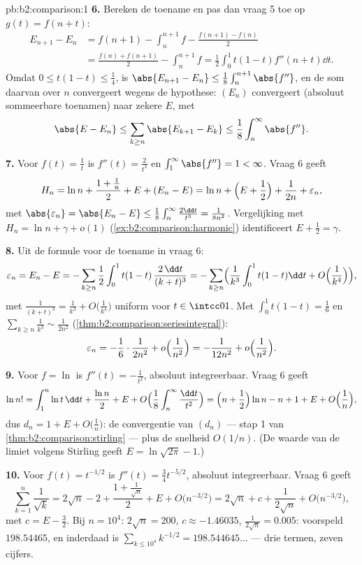 \begin{solution}{pb:b2:comparison:1}
\textbf{6.} Bereken de toename en pas dan vraag 5 toe op $g(t) =
f(n + t)$:
\begin{align*}
E_{n+1} - E_n
&= f(n{+}1) - \int_n^{n+1}\!f - \frac{f(n{+}1) - f(n)}2 \\
&= \frac{f(n) + f(n{+}1)}2 - \int_n^{n+1}\!f
= \frac12\int_0^1 t(1-t)f''(n+t)\dd t .
\end{align*}
Omdat $0 \leq t(1-t) \leq \frac14$, is $\abs{E_{n+1} - E_n} \leq
\frac18\int_n^{n+1}\abs{f''}$, en de som daarvan over $n$
convergeert wegens de hypothese: $(E_n)$ convergeert (absoluut
sommeerbare toenamen) naar zekere $E$, met
\[
\abs{E - E_n} \leq \sum_{k\geq n}\abs{E_{k+1} - E_k} \leq
\frac18\int_n^\infty\abs{f''} .
\]

\textbf{7.} Voor $f(t) = \frac1t$ is $f''(t) = \frac2{t^3}$ en
$\int_1^\infty\abs{f''} = 1 < \infty$. Vraag 6 geeft
\[
H_n = \ln n + \frac{1 + \frac1n}{2} + E + (E_n - E)
= \ln n + \Bigl(E + \frac12\Bigr) + \frac1{2n} +
\varepsilon_n,
\]
met $\abs{\varepsilon_n} = \abs{E_n - E} \leq
\frac18\int_n^\infty\frac{2\dd t}{t^3} = \frac1{8n^2}$.
Vergelijking met $H_n = \ln n + \gamma + o(1)$
(\cref{ex:b2:comparison:harmonic}) identificeert $E + \frac12 =
\gamma$.

\textbf{8.} Uit de formule voor de toename in vraag 6:
\[
\varepsilon_n = E_n - E = -\sum_{k\geq n}\frac12\int_0^1
t(1-t)\,\frac{2\,\dd t}{(k+t)^3}
= -\sum_{k \geq n}\Bigl(\frac1{k^3}\int_0^1t(1-t)\dd t +
O\Bigl(\frac1{k^4}\Bigr)\Bigr),
\]
met $\frac{1}{(k+t)^3} = \frac1{k^3} + O\bigl(\frac1{k^4}\bigr)$
uniform voor $t \in \intcc01$. Met $\int_0^1 t(1-t) = \frac16$ en
$\sum_{k\geq n}\frac1{k^3} \sim \frac{1}{2n^2}$
(\cref{thm:b2:comparison:seriesintegral}):
\[
\varepsilon_n = -\frac16\cdot\frac{1}{2n^2} +
o\Bigl(\frac1{n^2}\Bigr) = -\frac{1}{12n^2} +
o\Bigl(\frac{1}{n^2}\Bigr).
\]

\textbf{9.} Voor $f = \ln$ is $f''(t) = -\frac1{t^2}$, absoluut
integreerbaar. Vraag 6 geeft
\[
\ln n! = \int_1^n\ln t\,\dd t + \frac{\ln n}2 + E + O\Bigl(
\frac1{8}\int_n^\infty\frac{\dd t}{t^2}\Bigr)
= \Bigl(n + \frac12\Bigr)\ln n - n + 1 + E +
O\Bigl(\frac1n\Bigr),
\]
dus $d_n = 1 + E + O\bigl(\frac1n\bigr)$: de convergentie van
$(d_n)$ --- stap 1 van \cref{thm:b2:comparison:stirling} --- plus
de snelheid $O(1/n)$. (De waarde van de limiet volgens Stirling
geeft $E = \ln\sqrt{2\pi} - 1$.)

\textbf{10.} Voor $f(t) = t^{-1/2}$ is $f''(t) = \frac34
t^{-5/2}$, absoluut integreerbaar. Vraag 6 geeft
\[
\sum_{k=1}^n \frac1{\sqrt k}
= 2\sqrt n - 2 + \frac{1 + \frac1{\sqrt n}}2 + E +
O\bigl(n^{-3/2}\bigr)
= 2\sqrt n + c + \frac{1}{2\sqrt n} +
O\bigl(n^{-3/2}\bigr),
\]
met $c = E - \frac32$. Bij $n = 10^4$: $2\sqrt n = 200$, $c
\approx -1.46035$, $\frac1{2\sqrt n} = 0.005$: voorspeld
$198.54465$, en inderdaad is $\sum_{k\leq10^4}k^{-1/2} =
198.544645\dots$ --- drie termen, zeven cijfers.


\end{solution}
